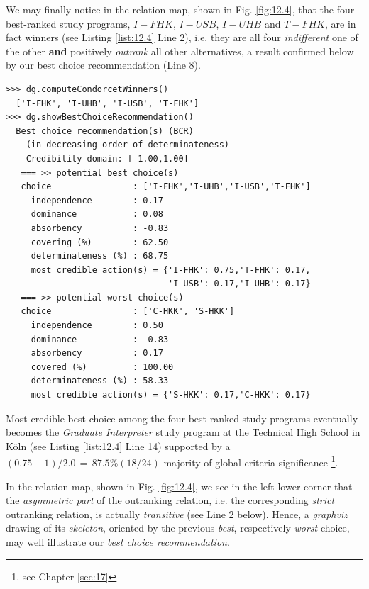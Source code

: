 We may finally notice in the relation map, shown in Fig. \ref{fig:12.4}, that the four best-ranked study programs, $I-FHK$, $I-USB$, $I-UHB$ and $T-FHK$,  are in fact \Condorcet winners (see Listing \ref{list:12.4} Line 2), i.e. they are all four \emph{indifferent} one of the other \textbf{and} positively \emph{outrank} all other alternatives, a result confirmed below by our best choice recommendation (Line 8).
   \begin{lstlisting}[caption={Alice's best choice recommendation},label=list:12.4]
>>> dg.computeCondorcetWinners()
  ['I-FHK', 'I-UHB', 'I-USB', 'T-FHK'] 
>>> dg.showBestChoiceRecommendation()
  Best choice recommendation(s) (BCR)
    (in decreasing order of determinateness)   
    Credibility domain: [-1.00,1.00]
   === >> potential best choice(s)
   choice                : ['I-FHK','I-UHB','I-USB','T-FHK']
     independence        : 0.17
     dominance           : 0.08
     absorbency          : -0.83
     covering (%)        : 62.50
     determinateness (%) : 68.75
     most credible action(s) = {'I-FHK': 0.75,'T-FHK': 0.17,
                                'I-USB': 0.17,'I-UHB': 0.17}
   === >> potential worst choice(s) 
   choice                : ['C-HKK', 'S-HKK']
     independence        : 0.50
     dominance           : -0.83
     absorbency          : 0.17
     covered (%)         : 100.00
     determinateness (%) : 58.33
     most credible action(s) = {'S-HKK': 0.17,'C-HKK': 0.17}
\end{lstlisting}
   
Most credible best choice among the four best-ranked study programs eventually becomes the \emph{Graduate Interpreter} study program at the Technical High School in Köln (see Listing \ref{list:12.4} Line 14) supported by a $(0.75 + 1)/2.0 \,=\,87.5\% (18/24)$ majority of global criteria significance \footnote{see Chapter \ref{sec:17}}.

In the relation map, shown in Fig. \ref{fig:12.4}, we see in the left lower corner that the \emph{asymmetric part} of the outranking relation, i.e. the corresponding \emph{strict} outranking relation, is actually \emph{transitive} (see Line 2 below). Hence, a \emph{graphviz} drawing of its \emph{skeleton}, oriented by the previous \emph{best}, respectively \emph{worst} choice, may well illustrate our \emph{best choice recommendation}.

